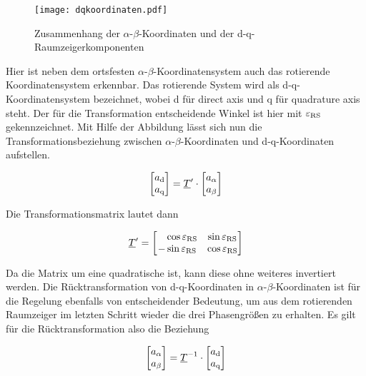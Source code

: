 \begin{figure}[h]
	\centering
	\texttt{[image: dqkoordinaten.pdf]}
	\label{fig:dqkoordinaten}
	\caption{Zusammenhang der $\alpha$-$\beta$-Koordinaten und der d-q- Raumzeigerkomponenten}
\end{figure}


Hier ist neben dem ortsfesten $\alpha$-$\beta$-Koordinatensystem auch das rotierende Koordinatensystem erkennbar. 
Das rotierende System wird als d-q-Koordinatensystem bezeichnet, wobei d für direct axis und q für quadrature axis steht.
Der für die Transformation entscheidende Winkel ist hier mit $\varepsilon_{\mathrm{RS}}$ gekennzeichnet.
Mit Hilfe der Abbildung lässt sich nun die Transformationsbeziehung zwischen $\alpha$-$\beta$-Koordinaten und d-q-Koordinaten aufstellen.

\begin{align}
	\begin{bmatrix}
		a_{\mathrm{d}} \\
		a_{\mathrm{q}} 
	\end{bmatrix}
	=\underline{T}{^\prime}\cdot 
	\begin{bmatrix}
		a_{\alpha} \\
		a_{\beta}
	\end{bmatrix}
	\label{parkvektor}
\end{align}

Die Transformationsmatrix lautet dann

\begin{align}
	\underline{T}{^\prime} =
	\begin{bmatrix}
		~~~\cos{\varepsilon_{\mathrm{RS}}} & \sin{\varepsilon_{\mathrm{RS}}} \\
		-\sin{\varepsilon_{\mathrm{RS}}} & \cos{\varepsilon_{\mathrm{RS}}}
	\end{bmatrix}
	\label{parkmatrix}
\end{align}

Da die Matrix um eine quadratische ist, kann diese ohne weiteres invertiert werden.
Die Rücktransformation von d-q-Koordinaten in $\alpha$-$\beta$-Koordinaten ist für die Regelung ebenfalls von entscheidender Bedeutung, um aus dem rotierenden Raumzeiger im letzten Schritt wieder die drei Phasengrößen zu erhalten. 
Es gilt für die Rücktransformation also die Beziehung

\begin{align}
	\begin{bmatrix}
		a_{\alpha} \\
		a_{\beta}
	\end{bmatrix}
	=\underline{T}^{-1}\cdot 
	\begin{bmatrix}
		a_{\mathrm{d}} \\
		a_{\mathrm{q}} 
	\end{bmatrix}
	\label{parkvektorinvers}
\end{align}

